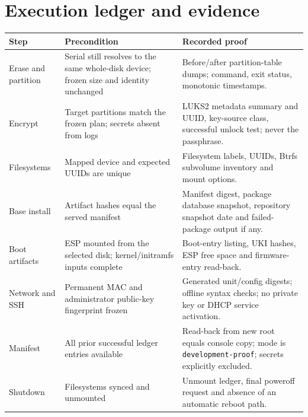 \section{Execution ledger and evidence}
\begin{tabularx}{\linewidth}{@{}p{.18\linewidth}p{.27\linewidth}L@{}}
\toprule
\textbf{Step} & \textbf{Precondition} & \textbf{Recorded proof}\\
\midrule
Erase and partition & Serial still resolves to the same whole-disk device; frozen size and identity unchanged & Before/after partition-table dumps; command, exit status, monotonic timestamps.\\
Encrypt & Target partitions match the frozen plan; secrets absent from logs & LUKS2 metadata summary and UUID, key-source class, successful unlock test; never the passphrase.\\
Filesystems & Mapped device and expected UUIDs are unique & Filesystem labels, UUIDs, Btrfs subvolume inventory and mount options.\\
Base install & Artifact hashes equal the served manifest & Manifest digest, package database snapshot, repository snapshot date and failed-package output if any.\\
Boot artifacts & ESP mounted from the selected disk; kernel/initramfs inputs complete & Boot-entry listing, UKI hashes, ESP free space and firmware-entry read-back.\\
Network and SSH & Permanent MAC and administrator public-key fingerprint frozen & Generated unit/config digests; offline syntax checks; no private key or DHCP service activation.\\
Manifest & All prior successful ledger entries available & Read-back from new root equals console copy; mode is \texttt{development-proof}; secrets explicitly excluded.\\
Shutdown & Filesystems synced and unmounted & Unmount ledger, final poweroff request and absence of an automatic reboot path.\\
\bottomrule
\end{tabularx}

